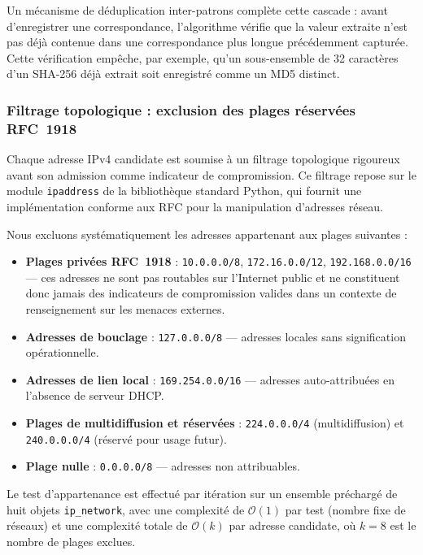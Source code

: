 Un mécanisme de déduplication inter-patrons complète cette cascade : avant d'enregistrer une correspondance, l'algorithme vérifie que la valeur extraite n'est pas déjà contenue dans une correspondance plus longue précédemment capturée. Cette vérification empêche, par exemple, qu'un sous-ensemble de 32 caractères d'un SHA-256 déjà extrait soit enregistré comme un MD5 distinct.

\subsubsection{Filtrage topologique : exclusion des plages réservées RFC~1918}

Chaque adresse IPv4 candidate est soumise à un filtrage topologique rigoureux avant son admission comme indicateur de compromission. Ce filtrage repose sur le module \texttt{ipaddress} de la bibliothèque standard Python, qui fournit une implémentation conforme aux RFC pour la manipulation d'adresses réseau.

Nous excluons systématiquement les adresses appartenant aux plages suivantes :

\begin{itemize}
    \item \textbf{Plages privées RFC~1918} : \texttt{10.0.0.0/8}, \texttt{172.16.0.0/12}, \texttt{192.168.0.0/16} --- ces adresses ne sont pas routables sur l'Internet public et ne constituent donc jamais des indicateurs de compromission valides dans un contexte de renseignement sur les menaces externes.
    \item \textbf{Adresses de bouclage} : \texttt{127.0.0.0/8} --- adresses locales sans signification opérationnelle.
    \item \textbf{Adresses de lien local} : \texttt{169.254.0.0/16} --- adresses auto-attribuées en l'absence de serveur DHCP.
    \item \textbf{Plages de multidiffusion et réservées} : \texttt{224.0.0.0/4} (multidiffusion) et \texttt{240.0.0.0/4} (réservé pour usage futur).
    \item \textbf{Plage nulle} : \texttt{0.0.0.0/8} --- adresses non attribuables.
\end{itemize}

Le test d'appartenance est effectué par itération sur un ensemble préchargé de huit objets \texttt{ip\_network}, avec une complexité de $\mathcal{O}(1)$ par test (nombre fixe de réseaux) et une complexité totale de $\mathcal{O}(k)$ par adresse candidate, où $k = 8$ est le nombre de plages exclues.

